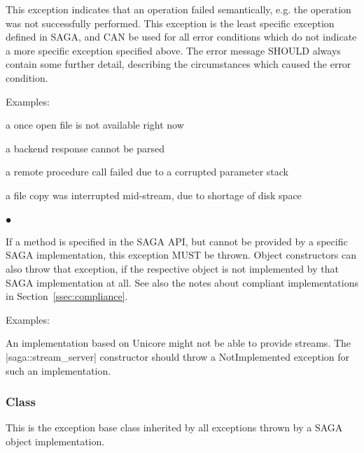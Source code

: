     This exception indicates that an operation failed
    semantically, e.g. the operation was not successfully
    performed.   This exception is the least specific exception
    defined in SAGA, and CAN be used for all error conditions
    which do not indicate a more specific exception specified
    above.  The error message SHOULD always contain
    some further detail, describing the circumstances which
    caused the error condition.
 
    Examples:
 
    \begin{shortlist}
     \item a once open file is not available right now
     \item a backend response cannot be parsed
     \item a remote procedure call failed due to a 
           corrupted parameter stack
     \item a file copy was interrupted mid-stream, due to 
           shortage of disk space
    \end{shortlist}
 

  \subsubsection*{$\bullet$ }\up
  
    If a method is specified in the SAGA API, but cannot be
    provided by a specific SAGA implementation, this exception
    MUST be thrown.  Object constructors can also throw that
    exception, if the respective object is not implemented by
    that SAGA implementation at all. See also the notes about
    compliant implementations in Section~\ref{ssec:compliance}.
 
    Examples:
 
    \begin{shortlist}
     \item An implementation based on Unicore might not be able
       to provide streams.  The |saga::stream_server| 
       constructor should throw a NotImplemented exception for 
       such an implementation.
    \end{shortlist}
 
 
 
 
 \subsubsection*{Class }
  
    This is the exception base class inherited by all exceptions
    thrown by a SAGA object implementation.  
 
